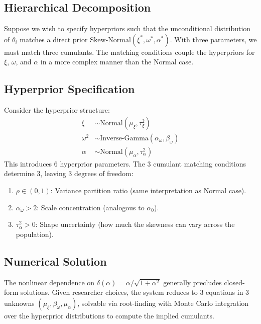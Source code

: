 \subsection{Hierarchical Decomposition}

Suppose we wish to specify hyperpriors such that the unconditional distribution
of $\theta_i$ matches a direct prior $\text{Skew-Normal}(\xi^*, \omega^*, \alpha^*)$.
With three parameters, we must match three cumulants. The matching conditions
couple the hyperpriors for $\xi$, $\omega$, and $\alpha$ in a more complex
manner than the Normal case.

\subsection{Hyperprior Specification}

Consider the hyperprior structure:
\begin{align}
  \xi &\sim \text{Normal}(\mu_\xi, \tau_\xi^2) \\
  \omega^2 &\sim \text{Inverse-Gamma}(\alpha_\omega, \beta_\omega) \\
  \alpha &\sim \text{Normal}(\mu_\alpha, \tau_\alpha^2)
\end{align}
This introduces 6 hyperprior parameters. The 3 cumulant matching conditions
determine 3, leaving 3 degrees of freedom:
\begin{enumerate}
  \item $\rho \in (0,1)$: Variance partition ratio (same interpretation as Normal case).
  \item $\alpha_\omega > 2$: Scale concentration (analogous to $\alpha_0$).
  \item $\tau_\alpha^2 > 0$: Shape uncertainty (how much the skewness can vary
    across the population).
\end{enumerate}

\subsection{Numerical Solution}

The nonlinear dependence on $\delta(\alpha) = \alpha/\sqrt{1+\alpha^2}$ generally
precludes closed-form solutions. Given researcher choices, the system
reduces to 3 equations in 3 unknowns $(\mu_\xi, \beta_\omega, \mu_\alpha)$,
solvable via root-finding with Monte Carlo integration over the hyperprior
distributions to compute the implied cumulants.


\pagebreak
